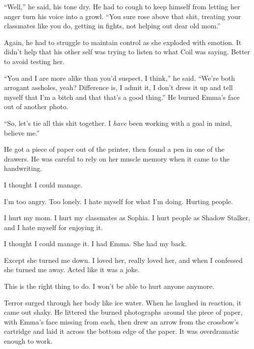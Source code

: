 ``Well,'' he said, his tone dry.  He had to cough to keep himself from letting her anger turn his voice into a growl.  ``You sure rose above that shit, treating your classmates like you do, getting in fights, not helping out dear old mom.''



Again, he had to struggle to maintain control as she exploded with emotion.  It didn't help that his other self was trying to listen to what Coil was saying.  Better to avoid testing her.



``You and I are more alike than you'd suspect, I think,'' he said. ``We're both arrogant assholes, yeah?  Difference is, I admit it, I don't dress it up and tell myself that I'm a bitch and that that's a good thing.''  He burned Emma's face out of another photo.



``So, let's tie all this shit together.  I \emph{have} been working with a goal in mind, believe me.''



He got a piece of paper out of the printer, then found a pen in one of the drawers.  He was careful to rely on her muscle memory when it came to the handwriting.



I thought I could manage.



I'm too angry.  Too lonely.  I hate myself for what I'm doing.  Hurting people.



I hurt my mom.  I hurt my classmates as Sophia.  I hurt people as Shadow Stalker, and I hate myself for enjoying it.



I thought I could manage it.  I had Emma.  She had my back.



Except she turned me down.  I loved her, really loved her, and when I confessed she turned me away.  Acted like it was a joke.



This is the right thing to do.  I won't be able to hurt anyone anymore.



Terror surged through her body like ice water.  When he laughed in reaction, it came out shaky.  He littered the burned photographs around the piece of paper, with Emma's face missing from each, then drew an arrow from the crossbow's cartridge and laid it across the bottom edge of the paper.  It was overdramatic enough to work.



